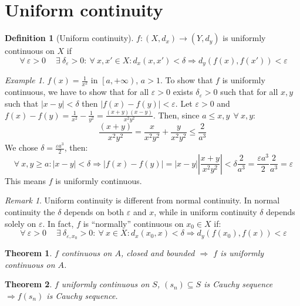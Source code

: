 \documentclass{article}
\newcommand{\abs}[1]{\left|#1\right|}
\newcommand{\Ar}{\Rightarrow}
\newcommand{\fr}[2]{\frac{#1}{#2}}
\newcommand{\f}[3]{#1 : #2 \rightarrow #3}
\theoremstyle{definition}
\newtheorem{definition}{Definition}[section]
\theoremstyle{definition}
\theoremstyle{plain}
\newtheorem{theorem}{Theorem}[section]
\theoremstyle{plain}
\theoremstyle{plain}
\theoremstyle{plain}
\theoremstyle{definition}
\theoremstyle{remark}
\newtheorem{exampled}{Example}[definition]
\theoremstyle{remark}
\theoremstyle{remark}
\theoremstyle{remark}
\newtheorem*{remark}{Remark}
\newcommand{\ForAll}{\ \forall \ }
\newcommand{\Exists}{\ \exists \ }
\newcommand{\E}{\varepsilon}
\begin{document}
\newpage
\section{Uniform continuity}


\begin{definition}[Uniform continuity]
  $\f{f}{(X,d_x)}{(Y,d_y)}$ is uniformly continuous on $X$ if
  \[
  \ForAll \E > 0 \quad \Exists \delta_\E > 0 : \ForAll x,x' \in X : d_x(x,x')
  < \delta \Ar d_y(f(x),f(x')) < \E
  \]
\end{definition}

\begin{exampled}
  $f(x) = \fr{1}{x^2}$ in $\left[a, +\infty\right)$, $a > 1$. To show that $f$ is uniformly continuous, we have to show that for all $\E > 0$ exists $\delta_\E > 0$ such that for all $x,y$ such that $\abs{x-y} < \delta$ then $\abs{f(x)-f(y)} < \E$. Let $\E > 0$ and $f(x) - f(y) = \fr{1}{x^2} - \fr{1}{y^2} = \fr{(x+y)(x-y)}{x^2 y^2}$. Then, since $a \leq x,y \ \ForAll x,y$:
    \[
    \fr{(x+y)}{x^2 y^2} = \fr{x}{x^2 y^2} + \fr{y}{x^2 y^2} \leq \fr{2}{a^3}
    \]
    We chose $\delta = \fr{\E a^3}{2}$, then:
    \[
    \ForAll x,y \geq a : \abs{x-y} < \delta \Ar \abs{f(x)-f(y)} =
    \abs{x-y} \abs{\fr{x+y}{x^2 y^2}} < \delta \fr{2}{a^3} =
    \fr{\E a^3}{2} \fr{2}{a^3} = \E
    \]
    This means $f$ is uniformly continuous.
\end{exampled}

\begin{remark}
  Uniform continuity is different from normal continuity. In normal continuity the $\delta$ depends on both $\E$ and $x$, while in uniform continuity $\delta$ depends solely on $\E$. In fact, $f$ is ``normally'' continuous on $x_0 \in X$ if:
  \[
  \ForAll \E > 0 \quad \Exists \delta_{\E,x_0} > 0 : \ForAll x \in X :
  d_x(x_0,x) < \delta \Ar d_y(f(x_0),f(x)) < \E
  \]
\end{remark}

\begin{theorem}
  $f$ continuous on $A$, closed and bounded $\Ar$ $f$ is uniformly continuous on $A$.
\end{theorem}


\begin{theorem}
  $f$ uniformly continuous on $S$, $(s_n) \subseteq S$ is Cauchy sequence $\Ar f(s_n)$ is Cauchy sequence.
\end{theorem}
\end{document}
